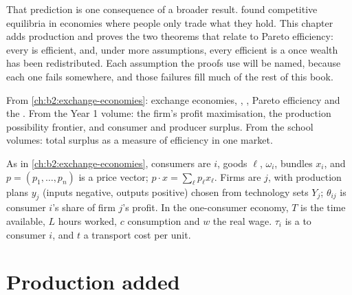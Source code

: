 That prediction is one consequence of a broader result.  found competitive
equilibria in economies where people only trade what they hold. This chapter adds production and proves
the two theorems that relate  to Pareto efficiency: every 
is efficient, and, under more assumptions, every efficient  is a  once
wealth has been redistributed. Each assumption the proofs use will be named, because each one fails
somewhere, and those failures fill much of the rest of this book.

\begin{recall}
From \cref{ch:b2:exchange-economies}: exchange economies, , , Pareto
efficiency and the . From the Year 1 volume: the firm's profit maximisation, the
production possibility frontier, and consumer and producer surplus. From the school volumes: total
surplus as a measure of efficiency in one market.
\end{recall}

\begin{notation}\label{not:b2:welfare-theorems:symbols}
As in \cref{ch:b2:exchange-economies}, consumers are $i$, goods $\ell$,  $\omega_i$, bundles
$x_i$, and $p = (p_1, \dots, p_n)$ is a price vector; $p \cdot x = \sum_\ell p_\ell x_\ell$. Firms are $j$,
with production plans $y_j$ (inputs negative, outputs positive) chosen from technology sets $Y_j$;
$\theta_{ij}$ is consumer $i$'s share of firm $j$'s profit. In the one-consumer economy, $T$ is the time
available, $L$ hours worked, $c$ consumption and $w$ the real wage. $\tau_i$ is a  to
consumer $i$, and $t$ a transport cost per unit.
\end{notation}

\section{Production added}\label{sec:b2:welfare-theorems:production}

